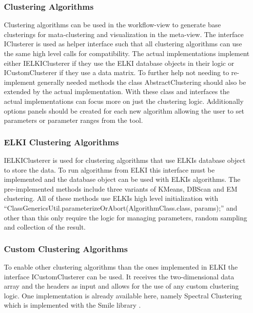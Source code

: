\documentclass[
	a4paper,
	english,
	twoside,
	openright,               
	11pt                            
	]{report}
\begin{document}
\subsubsection{Clustering Algorithms}
Clustering algorithms can be used in the workflow-view to generate base clusterings for mata-clustering and visualization in the meta-view. The interface IClusterer is used as helper interface such that all clustering algorithms can use the same high level calls for compatibility. The actual implementations implement either IELKIClusterer if they use the ELKI database objects in their logic or ICustomClusterer if they use a data matrix. To further help not needing to re-implement generally needed methods the class AbstractClustering should also be extended by the actual implementation. With these class and interfaces the actual implementations can focus more on just the clustering logic. Additionally options panels should be created for each new algorithm allowing the user to set parameters or parameter ranges from the tool.

\subsubsection{ELKI Clustering Algorithms}
IELKIClusterer is used for clustering algorithms that use ELKIs database object to store the data. To run algorithms from ELKI this interface must be implemented and the database object can be used with ELKIs algorithms. The pre-implemented methods include three variants of KMeans, DBScan and EM clustering. All of these methods use ELKIs high level initialization with ``ClassGenericsUtil.parameterizeOrAbort(AlgorithmClass.class, params);'' and other than this only require the logic for managing parameters, random sampling and collection of the result.

\subsubsection{Custom Clustering Algorithms}
To enable other clustering algorithms than the ones implemented in ELKI the interface ICustomClusterer can be used. It receives the two-dimensional data array and the headers as input and allows for the use of any custom clustering logic. One implementation is already available here, namely Spectral Clustering which is implemented with the Smile library \cite{javasmile}.
 
\end{document}

